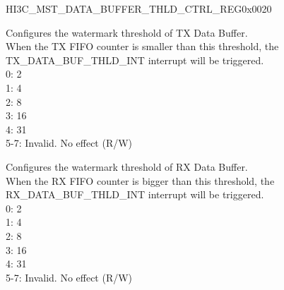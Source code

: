 \begin{register}{H}{I3C\_MST\_DATA\_BUFFER\_THLD\_CTRL\_REG}{0x0020}\label{regdesc:I3CMSTDATABUFFERTHLDCTRLREG}
%
%
%
\regnewline%
\begin{regdesc}\begin{reglist}
\label{fielddesc:I3CMSTREGTXDATABUFTHLD}\item [I3C\_MST\_REG\_TX\_DATA\_BUF\_THLD] Configures the watermark threshold of TX Data Buffer.\\
When the TX FIFO counter is smaller than this threshold, the TX\_DATA\_BUF\_THLD\_INT interrupt will be triggered.\\
0: 2\\
1: 4\\
2: 8\\
3: 16\\
4: 31\\
5-7: Invalid. No effect (R/W)
\label{fielddesc:I3CMSTREGRXDATABUFTHLD}\item [I3C\_MST\_REG\_RX\_DATA\_BUF\_THLD] Configures the watermark threshold of RX Data Buffer.\\
When the RX FIFO counter is bigger than this threshold, the RX\_DATA\_BUF\_THLD\_INT interrupt will be triggered.\\
0: 2\\
1: 4\\
2: 8\\
3: 16\\
4: 31\\
5-7: Invalid. No effect (R/W)
\end{reglist}\end{regdesc}
\end{register}


